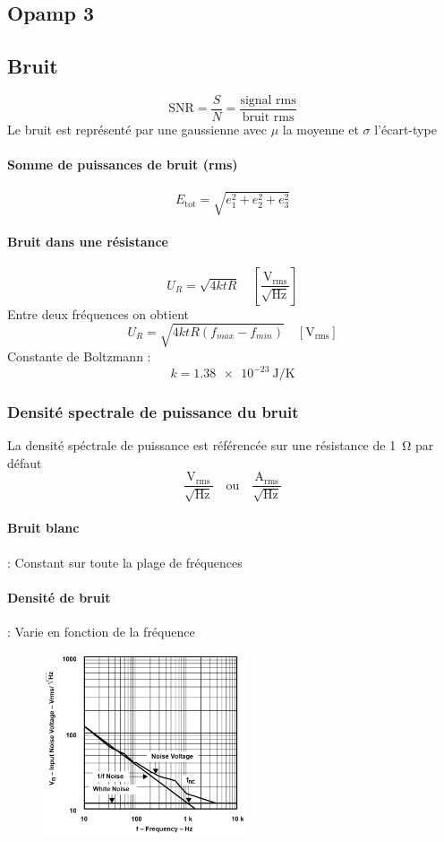 \documentclass[resume]{subfiles}
\begin{document}
\begin{multicols}{3}
\section{Opamp 3}
\subsection{Bruit}
$$\text{SNR}=\frac{S}{N}=\frac{\text{signal rms}}{\text{bruit rms}}$$
Le bruit est représenté par une gaussienne avec $\mu$ la moyenne et $\sigma$ l'écart-type
\paragraph{Somme de puissances de bruit (rms)}
$$\boxed{E_\text{tot}=\sqrt{e_1^2+e_2^2+e_3^2}}$$
\paragraph{Bruit dans une résistance}
$$U_R=\sqrt{4ktR}\quad\left[\frac{\si{\volt}_\text{rms}}{\sqrt{\si{\hertz}}}\right]$$
Entre deux fréquences on obtient
$$U_R=\sqrt{4ktR(f_{max}-f_{min})}\quad \left[\si{\volt_\text{rms}}\right]$$
Constante de Boltzmann :
$$k=\SI{1.38e-23}{\joule\per\kelvin}$$

\subsubsection{Densité spectrale de puissance du bruit}
La densité spéctrale de puissance est référencée sur une résistance de \SI{1}{\ohm} par défaut
$$\frac{\si{\volt}_\text{rms}}{\sqrt{\si{\hertz}}}\quad \text{ou}\quad \frac{\si{\ampere}_\text{rms}}{\sqrt{\si{\hertz}}}$$
\paragraph{Bruit blanc} : Constant sur toute la plage de fréquences
\paragraph{Densité de bruit} : Varie en fonction de la fréquence
\begin{figure}[H]
\centering
\includegraphics[width=6.00cm]{img_78.png}
\end{figure}

\end{multicols}
\end{document}
